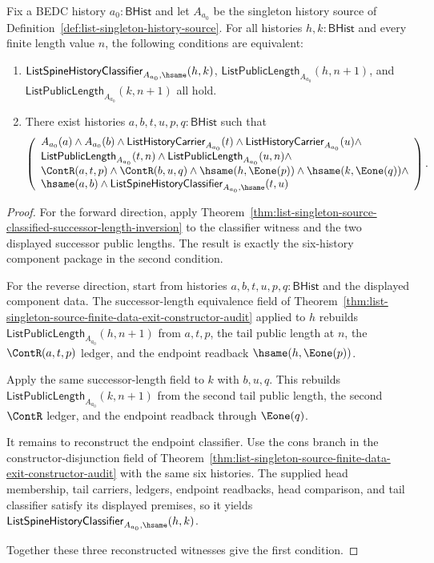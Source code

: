 \begin{theorem}
\label{thm:list-singleton-source-classified-successor-component-exactness}
Fix a BEDC history $a_0:\mathsf{BHist}$ and let $A_{a_0}$ be the singleton
history source of Definition~\ref{def:list-singleton-history-source}. For all
histories $h,k:\mathsf{BHist}$ and every finite length value $n$, the following
conditions are equivalent:
\begin{enumerate}
  \item
  $\mathsf{ListSpineHistoryClassifier}_{A_{a_0},\hsame}(h,k)$,
  $\mathsf{ListPublicLength}_{A_{a_0}}(h,n+1)$, and
  $\mathsf{ListPublicLength}_{A_{a_0}}(k,n+1)$ all hold.
  \item
  There exist histories $a,b,t,u,p,q:\mathsf{BHist}$ such that
  $$
  \left(
  \begin{array}{l}
  A_{a_0}(a)\land A_{a_0}(b)\land
  \mathsf{ListHistoryCarrier}_{A_{a_0}}(t)\land
  \mathsf{ListHistoryCarrier}_{A_{a_0}}(u)\land\\
  \mathsf{ListPublicLength}_{A_{a_0}}(t,n)\land
  \mathsf{ListPublicLength}_{A_{a_0}}(u,n)\land\\
  \ContR(a,t,p)\land \ContR(b,u,q)\land
  \hsame(h,\Eone(p))\land \hsame(k,\Eone(q))\land\\
  \hsame(a,b)\land
  \mathsf{ListSpineHistoryClassifier}_{A_{a_0},\hsame}(t,u)
  \end{array}
  \right).
  $$
\end{enumerate}
\end{theorem}
\begin{proof}
For the forward direction, apply
Theorem~\ref{thm:list-singleton-source-classified-successor-length-inversion} to
the classifier witness and the two displayed successor public lengths. The
result is exactly the six-history component package in the second condition.

For the reverse direction, start from histories $a,b,t,u,p,q:\mathsf{BHist}$
and the displayed component data. The successor-length equivalence field of
Theorem~\ref{thm:list-singleton-source-finite-data-exit-constructor-audit}
applied to $h$ rebuilds
$\mathsf{ListPublicLength}_{A_{a_0}}(h,n+1)$ from $a,t,p$, the tail public length
at $n$, the $\ContR(a,t,p)$ ledger, and the endpoint readback
$\hsame(h,\Eone(p))$.

Apply the same successor-length field to $k$ with $b,u,q$. This rebuilds
$\mathsf{ListPublicLength}_{A_{a_0}}(k,n+1)$ from the second tail public length,
the second $\ContR$ ledger, and the endpoint readback through $\Eone(q)$.

It remains to reconstruct the endpoint classifier. Use the cons branch in the
constructor-disjunction field of
Theorem~\ref{thm:list-singleton-source-finite-data-exit-constructor-audit} with
the same six histories. The supplied head membership, tail carriers, ledgers,
endpoint readbacks, head comparison, and tail classifier satisfy its displayed
premises, so it yields
$\mathsf{ListSpineHistoryClassifier}_{A_{a_0},\hsame}(h,k)$.

Together these three reconstructed witnesses give the first condition.
\end{proof}

